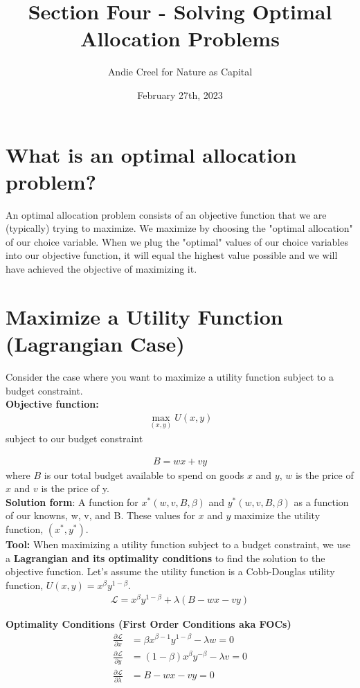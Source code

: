 \documentclass{article}
\title{Section Four - Solving Optimal Allocation Problems}
\author{Andie Creel for Nature as Capital}
\date{February 27th, 2023}
\begin{document}
\maketitle

\section{What is an optimal allocation problem?}
An optimal allocation problem consists of an objective function that we are (typically) trying to maximize. We maximize by choosing the "optimal allocation" of our choice variable. When we plug the "optimal" values of our choice variables into our objective function, it will equal the highest value possible and we will have achieved the objective of maximizing it. 

\section{Maximize a Utility Function (Lagrangian Case)}
Consider the case where you want to maximize a utility function subject to a budget constraint. \\

\textbf{Objective function:} 
\begin{align}
    \max_{(x,y)} U(x,y)
\end{align}
subject to our budget constraint 

\begin{align}
    B = wx + vy 
\end{align}
where $B$ is our total budget available to spend on goods $x$ and $y$, $w$ is the price of $x$ and $v$ is the price of y.\\ 

\textbf{Solution form}: A function for $x^*(w,v,B, \beta)$ and $y^*(w,v,B, \beta)$ as a function of our knowns, w, v, and B. These values for $x$ and $y$ maximize the utility function, $(x^*, y^*)$.\\
 
\textbf{Tool:} When maximizing a utility function subject to a budget constraint, we use a \textbf{Lagrangian and its optimality conditions} to find the solution to the objective function. Let's assume the utility function is a Cobb-Douglas utility function, $U(x,y) = x^\beta y ^{1-\beta}$.  
\begin{align}
    \mathscr{L} = x^\beta y ^{1-\beta} + \lambda (B - wx - vy) 
\end{align}

\textbf{Optimality Conditions (First Order Conditions aka FOCs)}
\begin{align}
    \frac{\partial \mathscr{L}}{\partial x}  &=  \beta x ^{\beta - 1} y^{1-\beta} -\lambda w = 0\\
    \frac{\partial \mathscr{L}}{\partial y} &= (1 - \beta) x ^\beta y^{-\beta} - \lambda v=  0\\
    \frac{\partial \mathscr{L}}{\partial \lambda} &= B - wx - vy = 0
\end{align}
\end{document}
